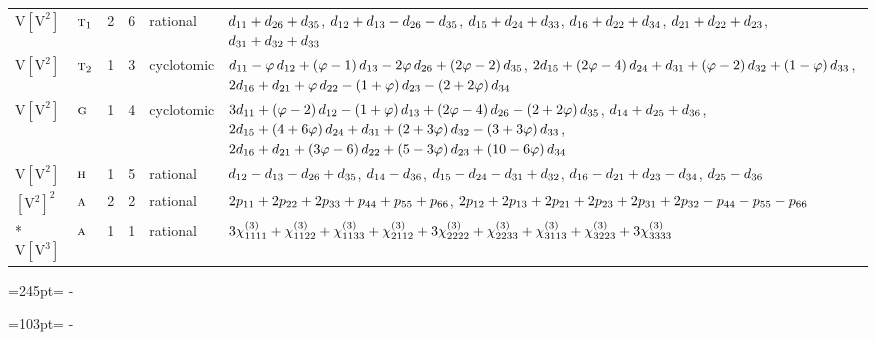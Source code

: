\documentclass[10pt,a4paper]{article}
\newcommand{\needspace}[1]{\par\penalty-100\begingroup\dimen0=#1\relax\dimen2=\pagegoal
  \advance\dimen2-\pagetotal\ifdim\dimen0>\dimen2\relax\ifdim\dimen2>0pt\vfil\break\fi\fi
  \endgroup}
\numberwithin{equation}{section}
\newcommand{\irr}[1]{\text{\normalfont\scshape #1}}
\newcommand{\goldenratio}{\varphi}
\newcommand{\jahn}[1]{\mathrm{#1}}
\newlength{\fillwidth}\newlength{\cellwidth}\newlength{\colwidth}
\newcommand{\signbreak}{\penalty100\relax}
\begin{document}
{\begin{longtable}{@{}llrrl>{\RaggedRight\arraybackslash}p{\fillwidth}@{}}
$\jahn{V[V^{2}]}$ & $\irr{t}_{1}$ & 2 & 6 & rational & $d_{11} +\signbreak d_{26} +\signbreak d_{35}$, $d_{12} +\signbreak d_{13} -\signbreak d_{26} -\signbreak d_{35}$, $d_{15} +\signbreak d_{24} +\signbreak d_{33}$, $d_{16} +\signbreak d_{22} +\signbreak d_{34}$, $d_{21} +\signbreak d_{22} +\signbreak d_{23}$, $d_{31} +\signbreak d_{32} +\signbreak d_{33}$\\
$\jahn{V[V^{2}]}$ & $\irr{t}_{2}$ & 1 & 3 & cyclotomic & $d_{11} -\signbreak \goldenratio{}\,d_{12} +\signbreak \left(\goldenratio -\signbreak 1\right)d_{13} -\signbreak 2\goldenratio{}\,d_{26} +\signbreak \left(2\goldenratio -\signbreak 2\right)d_{35}$, $2d_{15} +\signbreak \left(2\goldenratio -\signbreak 4\right)d_{24} +\signbreak d_{31} +\signbreak \left(\goldenratio -\signbreak 2\right)d_{32} +\signbreak \left(1 -\signbreak \goldenratio{}\right)d_{33}$, $2d_{16} +\signbreak d_{21} +\signbreak \goldenratio{}\,d_{22} -\signbreak \left(1 +\signbreak \goldenratio{}\right)d_{23} -\signbreak \left(2 +\signbreak 2\goldenratio{}\right)d_{34}$\\
$\jahn{V[V^{2}]}$ & $\irr{g}$ & 1 & 4 & cyclotomic & $3d_{11} +\signbreak \left(\goldenratio -\signbreak 2\right)d_{12} -\signbreak \left(1 +\signbreak \goldenratio{}\right)d_{13} +\signbreak \left(2\goldenratio -\signbreak 4\right)d_{26} -\signbreak \left(2 +\signbreak 2\goldenratio{}\right)d_{35}$, $d_{14} +\signbreak d_{25} +\signbreak d_{36}$, $2d_{15} +\signbreak \left(4 +\signbreak 6\goldenratio{}\right)d_{24} +\signbreak d_{31} +\signbreak \left(2 +\signbreak 3\goldenratio{}\right)d_{32} -\signbreak \left(3 +\signbreak 3\goldenratio{}\right)d_{33}$, $2d_{16} +\signbreak d_{21} +\signbreak \left(3\goldenratio -\signbreak 6\right)d_{22} +\signbreak \left(5 -\signbreak 3\goldenratio{}\right)d_{23} +\signbreak \left(10 -\signbreak 6\goldenratio{}\right)d_{34}$\\
$\jahn{V[V^{2}]}$ & $\irr{h}$ & 1 & 5 & rational & $d_{12} -\signbreak d_{13} -\signbreak d_{26} +\signbreak d_{35}$, $d_{14} -\signbreak d_{36}$, $d_{15} -\signbreak d_{24} -\signbreak d_{31} +\signbreak d_{32}$, $d_{16} -\signbreak d_{21} +\signbreak d_{23} -\signbreak d_{34}$, $d_{25} -\signbreak d_{36}$\\
$\jahn{[V^{2}]^{2}}$ & $\irr{a}$ & 2 & 2 & rational & $2p_{11} +\signbreak 2p_{22} +\signbreak 2p_{33} +\signbreak p_{44} +\signbreak p_{55} +\signbreak p_{66}$, $2p_{12} +\signbreak 2p_{13} +\signbreak 2p_{21} +\signbreak 2p_{23} +\signbreak 2p_{31} +\signbreak 2p_{32} -\signbreak p_{44} -\signbreak p_{55} -\signbreak p_{66}$\\*
$\jahn{V[V^{3}]}$ & $\irr{a}$ & 1 & 1 & rational & $3\chi^{(3)}_{1111} +\signbreak \chi^{(3)}_{1122} +\signbreak \chi^{(3)}_{1133} +\signbreak \chi^{(3)}_{2112} +\signbreak 3\chi^{(3)}_{2222} +\signbreak \chi^{(3)}_{2233} +\signbreak \chi^{(3)}_{3113} +\signbreak \chi^{(3)}_{3223} +\signbreak 3\chi^{(3)}_{3333}$\\
\bottomrule\end{longtable}}
\needspace{245pt}
\needspace{103pt}
\end{document}
